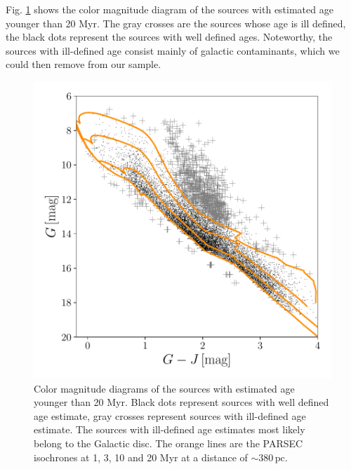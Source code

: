\documentclass[twocolumn]{aa}
\begin{document}
Fig. \ref{fig:6a} shows the color magnitude diagram of the sources with estimated age younger than 20 Myr. The gray crosses are the sources whose age is ill defined, the black dots represent the sources with well defined ages.
Noteworthy, the sources with ill-defined age consist mainly of galactic contaminants, which we could then remove from our sample.
\begin{figure}
\includegraphics[width = \hsize]{fig10.pdf}
\caption{Color magnitude diagrams of the sources with estimated age younger than 20 Myr. Black dots represent sources with well defined age estimate, gray crosses represent sources with ill-defined age estimate. The sources with ill-defined age estimates most likely belong to the Galactic disc.
The orange lines are the PARSEC isochrones at 1, 3, 10 and 20 Myr at a distance of $\sim 380 \,\mathrm{pc}$. 
}
\label{fig:6a}
\end{figure}
\end{document}
